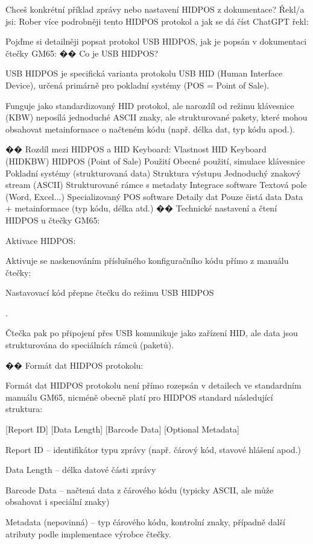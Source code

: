 Chceš konkrétní příklad zprávy nebo nastavení HIDPOS z dokumentace?
Řekl/a jsi:
Rober více podrobněji tento HIDPOS protokol a jak se dá číst
ChatGPT řekl:

Pojďme si detailněji popsat protokol USB HIDPOS, jak je popsán v dokumentaci čtečky GM65:
�� Co je USB HIDPOS?

USB HIDPOS je specifická varianta protokolu USB HID (Human Interface Device), určená primárně pro pokladní systémy (POS = Point of Sale).

    Funguje jako standardizovaný HID protokol, ale narozdíl od režimu klávesnice (KBW) neposílá jednoduché ASCII znaky, ale strukturované pakety, které mohou obsahovat metainformace o načteném kódu (např. délka dat, typ kódu apod.).

�� Rozdíl mezi HIDPOS a HID Keyboard:
Vlastnost	HID Keyboard (HIDKBW)	HIDPOS (Point of Sale)
Použití	Obecné použití, simulace klávesnice	Pokladní systémy (strukturovaná data)
Struktura výstupu	Jednoduchý znakový stream (ASCII)	Strukturované rámce s metadaty
Integrace software	Textová pole (Word, Excel...)	Specializovaný POS software
Detaily dat	Pouze čistá data	Data + metainformace (typ kódu, délka atd.)
�� Technické nastavení a čtení HIDPOS u čtečky GM65:

Aktivace HIDPOS:

Aktivuje se naskenováním příslušného konfiguračního kódu přímo z manuálu čtečky:

    Nastavovací kód přepne čtečku do režimu USB HIDPOS​

    .

    Čtečka pak po připojení přes USB komunikuje jako zařízení HID, ale data jsou strukturována do speciálních rámců (paketů).

�� Formát dat HIDPOS protokolu:

Formát dat HIDPOS protokolu není přímo rozepsán v detailech ve standardním manuálu GM65, nicméně obecně platí pro HIDPOS standard následující struktura:

[Report ID] [Data Length] [Barcode Data] [Optional Metadata]

    Report ID – identifikátor typu zprávy (např. čárový kód, stavové hlášení apod.)

    Data Length – délka datové části zprávy

    Barcode Data – načtená data z čárového kódu (typicky ASCII, ale může obsahovat i speciální znaky)

    Metadata (nepovinná) – typ čárového kódu, kontrolní znaky, případně další atributy podle implementace výrobce čtečky.

